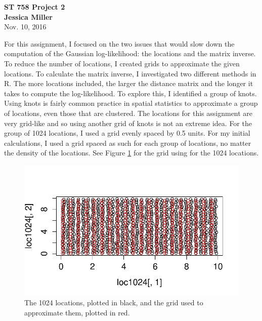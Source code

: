 \documentclass[11pt]{article}
\begin{document}
\begin{center}
	{\Large {\bf ST 758 Project 2}}\\ \vspace{12pt}
	{\large {\bf Jessica Miller}}\\ \vspace{12pt}
	Nov. 10, 2016
	\vspace{5mm}
	\vspace{5mm}
\end{center}

\begin{flushleft}
	For this assignment, I focused on the two issues that would slow down the computation of the Gaussian log-likelihood: the locations and the matrix inverse. To reduce the number of locations, I created grids to approximate the given locations. To calculate the matrix inverse, I investigated two different methods in R.
	\newline
	\newline
	The more locations included, the larger the distance matrix and the longer it takes to compute the log-likelihood. To explore this, I identified a group of knots. Using knots is fairly common practice in spatial statistics to approximate a group of locations, even those that are clustered. The locations for this assignment are very grid-like and so using another grid of knots is not an extreme idea. For the group of 1024 locations, I used a grid evenly spaced by 0.5 units. For my initial calculations, I used a grid spaced as such for each group of locations, no matter the density of the locations. See Figure \ref{e:max} for the grid using for the 1024 locations.	
\end{flushleft}

\begin{figure}[h]\begin{center}
		\caption{The 1024 locations, plotted in black, and the grid used to approximate them, plotted in red.}\label{e:max}
		\includegraphics[width=.8\textwidth]{proj2_1}	
	\end{center}\end{figure}
\end{document}
